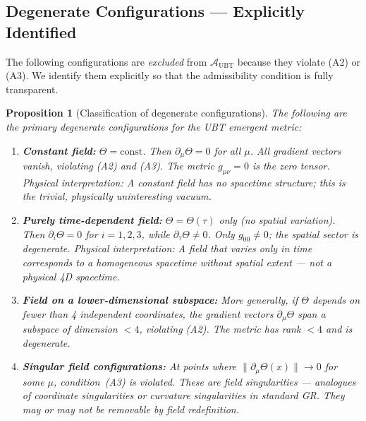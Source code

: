 \documentclass[12pt]{article}
\newtheorem{proposition}[theorem]{Proposition}
\theoremstyle{definition}
\theoremstyle{remark}
\begin{document}
\subsection{Degenerate Configurations — Explicitly Identified}

The following configurations are \emph{excluded} from $\mathcal{A}_{\mathrm{UBT}}$
because they violate (A2) or (A3).  We identify them explicitly so that the
admissibility condition is fully transparent.

\begin{proposition}[Classification of degenerate configurations]
\label{prop:degenerate}
The following are the primary degenerate configurations for the UBT emergent metric:
\begin{enumerate}
  \item \textbf{Constant field:} $\Theta = \mathrm{const}$.
        Then $\partial_\mu\Theta = 0$ for all $\mu$.
        All gradient vectors vanish, violating (A2) and (A3).
        The metric $g_{\mu\nu} = 0$ is the zero tensor.
        \emph{Physical interpretation:} A constant field has no spacetime structure;
        this is the trivial, physically uninteresting vacuum.

  \item \textbf{Purely time-dependent field:} $\Theta = \Theta(\tau)$ only (no spatial variation).
        Then $\partial_i\Theta = 0$ for $i=1,2,3$, while $\partial_\tau\Theta \neq 0$.
        Only $g_{00} \neq 0$; the spatial sector is degenerate.
        \emph{Physical interpretation:} A field that varies only in time corresponds to
        a homogeneous spacetime without spatial extent — not a physical 4D spacetime.

  \item \textbf{Field on a lower-dimensional subspace:}
        More generally, if $\Theta$ depends on fewer than 4 independent coordinates,
        the gradient vectors $\partial_\mu\Theta$ span a subspace of dimension $< 4$,
        violating (A2).  The metric has rank $< 4$ and is degenerate.

  \item \textbf{Singular field configurations:} At points where
        $\|\partial_\mu\Theta(x)\| \to 0$ for some $\mu$, condition~(A3) is violated.
        These are \emph{field singularities} — analogues of coordinate singularities
        or curvature singularities in standard GR.  They may or may not be removable
        by field redefinition.
\end{enumerate}
\end{proposition}
\end{document}
